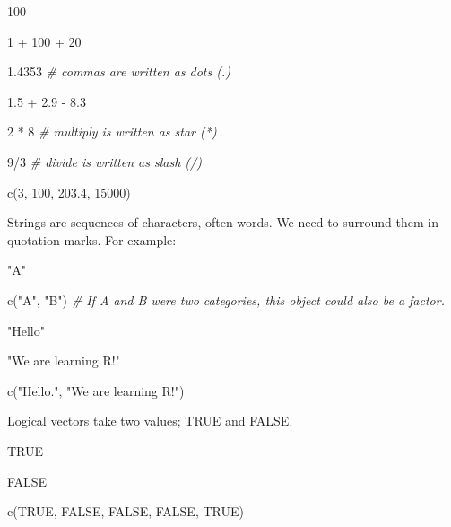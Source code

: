 \documentclass[
]{article}
\newenvironment{Shaded}{\begin{snugshade}}{\end{snugshade}}
\newcommand{\CommentTok}[1]{\textcolor[rgb]{0.56,0.35,0.01}{\textit{#1}}}
\newcommand{\ConstantTok}[1]{\textcolor[rgb]{0.00,0.00,0.00}{#1}}
\newcommand{\DecValTok}[1]{\textcolor[rgb]{0.00,0.00,0.81}{#1}}
\newcommand{\FloatTok}[1]{\textcolor[rgb]{0.00,0.00,0.81}{#1}}
\newcommand{\FunctionTok}[1]{\textcolor[rgb]{0.00,0.00,0.00}{#1}}
\newcommand{\NormalTok}[1]{#1}
\newcommand{\SpecialCharTok}[1]{\textcolor[rgb]{0.00,0.00,0.00}{#1}}
\newcommand{\StringTok}[1]{\textcolor[rgb]{0.31,0.60,0.02}{#1}}
\begin{document}
\begin{Shaded}
\begin{Highlighting}[]
\DecValTok{100}

\DecValTok{1} \SpecialCharTok{+} \DecValTok{100} \SpecialCharTok{+} \DecValTok{20}

\FloatTok{1.4353}  \CommentTok{\# commas are written as dots (.)}

\FloatTok{1.5} \SpecialCharTok{+} \FloatTok{2.9} \SpecialCharTok{{-}} \FloatTok{8.3}

\DecValTok{2} \SpecialCharTok{*} \DecValTok{8}  \CommentTok{\# multiply is written as star (*)}

\DecValTok{9}\SpecialCharTok{/}\DecValTok{3}  \CommentTok{\# divide is written as slash (/)}

\FunctionTok{c}\NormalTok{(}\DecValTok{3}\NormalTok{, }\DecValTok{100}\NormalTok{, }\FloatTok{203.4}\NormalTok{, }\DecValTok{15000}\NormalTok{)}
\end{Highlighting}
\end{Shaded}

Strings are sequences of characters, often words. We need to surround
them in quotation marks. For example:

\begin{Shaded}
\begin{Highlighting}[]
\StringTok{"A"}

\FunctionTok{c}\NormalTok{(}\StringTok{"A"}\NormalTok{, }\StringTok{"B"}\NormalTok{)  }\CommentTok{\# If \textquotesingle{}A\textquotesingle{} and \textquotesingle{}B\textquotesingle{} were two categories, this object could also be a factor.}

\StringTok{"Hello"}

\StringTok{"We are learning R!"}

\FunctionTok{c}\NormalTok{(}\StringTok{"Hello."}\NormalTok{, }\StringTok{"We are learning R!"}\NormalTok{)}
\end{Highlighting}
\end{Shaded}

Logical vectors take two values; TRUE and FALSE.

\begin{Shaded}
\begin{Highlighting}[]
\ConstantTok{TRUE}

\ConstantTok{FALSE}

\FunctionTok{c}\NormalTok{(}\ConstantTok{TRUE}\NormalTok{, }\ConstantTok{FALSE}\NormalTok{, }\ConstantTok{FALSE}\NormalTok{, }\ConstantTok{FALSE}\NormalTok{, }\ConstantTok{TRUE}\NormalTok{)}
\end{Highlighting}
\end{Shaded}
\end{document}
